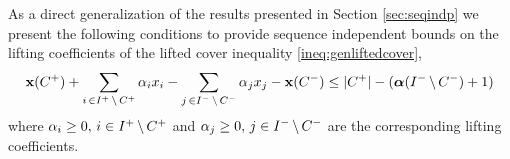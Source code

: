 \documentclass[10pt,twoside]{amsart}
\begin{document}
%
%
As a direct generalization of the results presented in Section \ref{sec:seqindp} we present the following conditions to provide sequence independent bounds on the lifting coefficients of the lifted cover inequality \eqref{ineq:genliftedcover},
\begin{align*}
    \mathbf{x}(C^+) + \sum_{i\,\in I^+\,\backslash\, C^+} \alpha_i x_i - \sum_{j\,\in I^-\,\backslash\, C^-} \alpha_j x_j - \mathbf{x}(C^-) \leq |C^+| - (\boldsymbol\alpha(I^-\,\backslash\, C^-) + 1)
\end{align*}
where $\alpha_i \geq 0,\,i\in I^+\,\backslash\, C^+$ and $\alpha_j \geq 0,\,j\in I^-\,\backslash\, C^-$ are the corresponding lifting coefficients.
\end{document}
